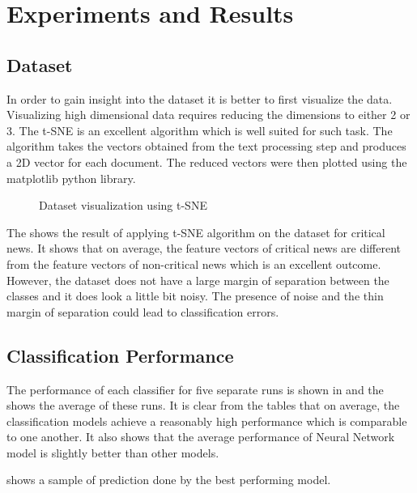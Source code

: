 \chapter{Experiments and Results} \label{result}

\section{Dataset}
In order to gain insight into the dataset it is better to first visualize the data. Visualizing high dimensional data requires reducing the dimensions to either 2 or 3. The t-SNE\cite{maaten2008visualizing} is an excellent algorithm which is well suited for such task. The algorithm takes the vectors obtained from the text processing step and produces a 2D vector for each document. The reduced vectors were then plotted using the matplotlib\cite{hunter2007matplotlib} python library. 

\begin{figure}[h]
    \caption{Dataset visualization using t-SNE}
    \label{fig:dataset}
\end{figure}

The  shows the result of applying t-SNE algorithm on the dataset for critical news. It shows that on average, the feature vectors of critical news are different from the feature vectors of non-critical news which is an excellent outcome. However, the dataset does not have a large margin of separation between the classes and it does look a little bit noisy. The presence of noise and the thin margin of separation could lead to classification errors.

\section{Classification Performance}
The performance of each classifier for five separate runs is shown in  and the  shows the average of these runs. It is clear from the tables that on average, the classification models achieve a reasonably high performance which is comparable to one another. It also shows that the average performance of Neural Network model is slightly better than other models.

 shows a sample of prediction done by the best performing model.


